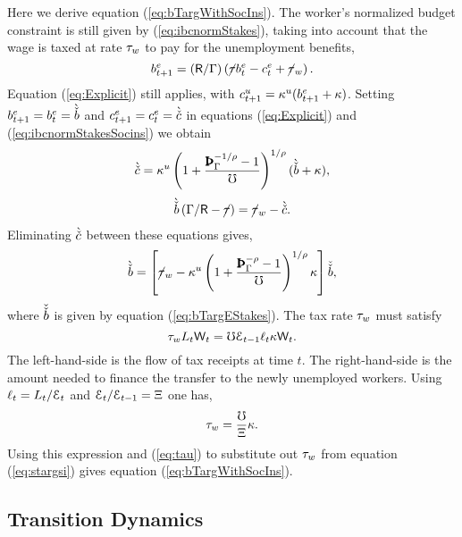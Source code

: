 \documentclass[titlepage,abstract,letterpaper]{econtex}
\begin{document}
Here we derive equation (\ref{eq:bTargWithSocIns}). The worker's normalized budget constraint is still given by (\ref{eq:ibcnormStakes}), taking into account that the wage is taxed at rate $\tau_w$ to pay for the unemployment benefits,
\begin{equation}
b^{e}_{t+1} = (\mathsf{R}/\Gamma)\left(\cancel{\tau} b^{e}_{t} -c^{e}_{t}+\cancel{\tau}_w\right).
\label{eq:ibcnormStakesSocins}
\end{equation}
Equation (\ref{eq:Explicit}) still applies, with $c^{u}_{t+1}=\kappa^{u} (b^{e}_{t+1}+\kappa)$. Setting $b^{e}_{t+1}=b^{e}_t=\grave{\check{b}}$ and $c^{e}_{t+1}=c^{e}_t=\grave{\check{c}}$ in equations (\ref{eq:Explicit}) and (\ref{eq:ibcnormStakesSocins}) we obtain
\begin{eqnarray*}
\Alt{\cTarg}= \MPCU \left(1+\frac{\PatPGro^{-1/\CRRA}-1}{\urate}\right)^{1/\CRRA}  (\Alt{\bTarg}+\Severance),
\end{eqnarray*}
\begin{eqnarray*}
\grave{\check{b}} \left( \Gamma /\mathsf{R} -\cancel{\tau} \right) = \cancel{\tau}_w - \grave{\check{c}}.
\end{eqnarray*}
Eliminating $\grave{\check{c}}$ between these equations gives,
\begin{equation}
\Alt{\bTarg} = \left[ \TaxFree_w - \MPCU \left(1+\frac{\PatPGro^{-\CRRA}-1}{\urate}\right)^{1/\CRRA} \Severance \right] \bTargTarg,
\label{eq:stargsi}
\end{equation}
where $\check{\check{b}}$ is given by equation (\ref{eq:bTargEStakes}).
The tax rate $\tau_w$ must satisfy
\begin{equation}
\tau_w L_t \mathsf{W}_t =\mho \mathcal{E}_{t-1} \ell_{t} \kappa \mathsf{W}_t. \label{eq:taxBalance}
\end{equation}
The left-hand-side is the flow of tax receipts at time $t$. The right-hand-side is the amount needed to finance the transfer to the newly unemployed workers. Using $\ell_{t}=L_t /\mathcal{E}_t$ and $\mathcal{E}_t / \mathcal{E}_{t-1}= \Xi$ one has,
\begin{equation*}
\tau_w = \frac{\mho}{\Xi} \kappa.
\end{equation*}
Using this expression and (\ref{eq:tau}) to substitute out $\tau_w$ from equation (\ref{eq:stargsi}) gives equation (\ref{eq:bTargWithSocIns}).

\subsection{Transition Dynamics}
\end{document}
